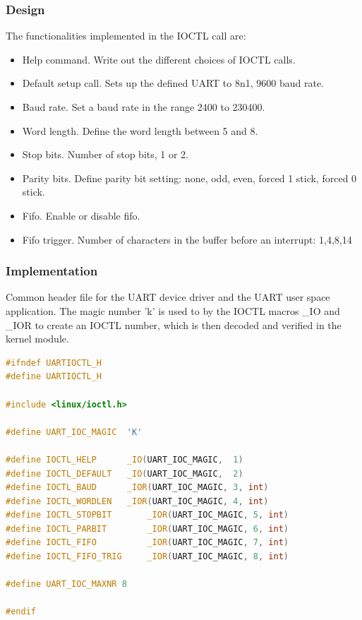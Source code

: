 \subsubsection{Design}
The functionalities implemented in the IOCTL call are:
\begin{itemize}
	\item Help command. Write out the different choices of IOCTL calls.
	\item Default setup call. Sets up the defined UART to 8n1, 9600 baud rate. 
	\item Baud rate. Set a baud rate in the range 2400 to 230400.
	\item Word length. Define the word length between 5 and 8.
	\item Stop bits. Number of stop bits, 1 or 2.
	\item Parity bits. Define parity bit setting: none, odd, even, forced 1 stick, forced 0 stick.
	\item Fifo. Enable or disable fifo.
	\item Fifo trigger. Number of characters in the buffer before an interrupt: 1,4,8,14
\end{itemize}

%
%
\subsubsection{Implementation}
Common header file for the UART device driver and the UART user space application. The magic number 'k' is used to by the IOCTL macros \_IO and \_IOR to create an IOCTL number, which is then decoded and verified in the kernel module. 
\begin{lstlisting}[language=c]
#ifndef UARTIOCTL_H
#define UARTIOCTL_H

#include <linux/ioctl.h>

#define UART_IOC_MAGIC  'K'

#define IOCTL_HELP 		_IO(UART_IOC_MAGIC,  1)
#define IOCTL_DEFAULT	_IO(UART_IOC_MAGIC,  2)
#define IOCTL_BAUD 		_IOR(UART_IOC_MAGIC, 3, int)
#define IOCTL_WORDLEN 	_IOR(UART_IOC_MAGIC, 4, int)
#define IOCTL_STOPBIT 		_IOR(UART_IOC_MAGIC, 5, int)
#define IOCTL_PARBIT 		_IOR(UART_IOC_MAGIC, 6, int)
#define IOCTL_FIFO			_IOR(UART_IOC_MAGIC, 7, int)
#define IOCTL_FIFO_TRIG 	_IOR(UART_IOC_MAGIC, 8, int)

#define UART_IOC_MAXNR 8

#endif
\end{lstlisting}

